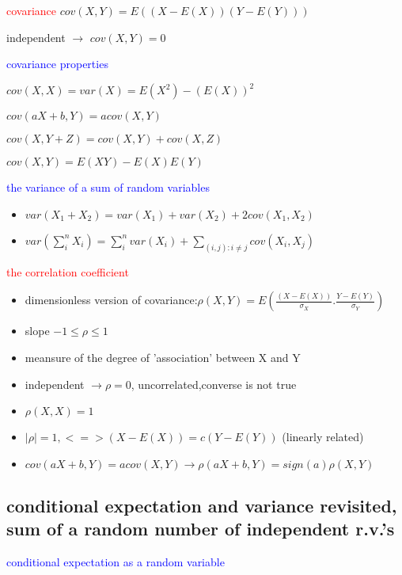 \textcolor{red}{covariance}
$cov(X,Y)=E((X-E(X))(Y-E(Y)))$

independent $\to$ $cov(X,Y)=0$

\textcolor{blue}{covariance properties}

$cov(X,X)=var(X)=E(X^2)-(E(X))^2$

$cov(a X+b,Y)=a cov(X,Y)$

$cov(X,Y+Z)=cov(X,Y)+cov(X,Z)$

$cov(X,Y)=E(X Y)-E(X)E(Y)$


\textcolor{blue}{the variance of a sum of random variables}

\begin{itemize}
    \item $var(X_1+X_2)=var(X_1)+var(X_2)+2cov(X_1,X_2)$
    \item $var(\sum_i ^n X_i)=\sum_i^n var(X_i)+\sum_{(i,j):i\neq j}cov(X_i,X_j)$
\end{itemize}

\textcolor{red}{the correlation coefficient}

\begin{itemize}
    \item dimensionless version of covariance:$\rho(X,Y)=E(\frac{(X-E(X))}{\sigma_X}.\frac{Y-E(Y)}{\sigma_Y})$
    \item slope $-1\le \rho \le 1$ 
    \item meansure of the degree of 'association' between X and Y
    \item independent $\to \rho =0$, uncorrelated,converse is not true
    \item $\rho(X,X)=1$
    \item $|\rho|=1,<=>(X-E(X))=c(Y-E(Y))$ (linearly related)
    \item $cov(a X+b,Y)=a cov(X,Y)\to \rho(a X+b,Y)=sign(a)\rho(X,Y)$
\end{itemize}


\subsection*{conditional expectation and variance revisited, sum of a random number of independent r.v.'s}


\textcolor{blue}{conditional expectation as a random variable}

